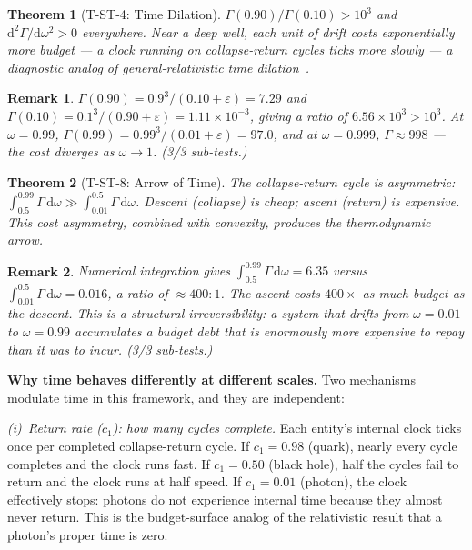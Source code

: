 \documentclass[
  aps,
  prd,
  twocolumn,
  superscriptaddress,
  nofootinbib,
  floatfix
]{revtex4-2}
\newtheorem{theorem}{Theorem}
\newtheorem{remark}{Remark}
\newcommand{\Gam}{\Gamma}
\newcommand{\eps}{\varepsilon}
\newcommand{\dd}{\mathrm{d}}
\begin{document}
\begin{theorem}[T-ST-4: Time Dilation]\label{thm:T4}
$\Gam(0.90)/\Gam(0.10) > 10^3$ and $\dd^2\Gam/\dd\omega^2 > 0$
everywhere.  Near a deep well, each unit of drift costs
exponentially more budget --- a clock running on collapse-return
cycles ticks more slowly --- a diagnostic analog of
general-relativistic time
dilation~\cite{einstein1916gr,misner1973gravitation}.
\end{theorem}

\begin{remark}
$\Gam(0.90) = 0.9^3/(0.10 + \eps) = 7.29$ and
$\Gam(0.10) = 0.1^3/(0.90 + \eps) = 1.11 \times 10^{-3}$,
giving a ratio of $6.56 \times 10^{3} > 10^{3}$.
At $\omega = 0.99$, $\Gam(0.99) = 0.99^3/(0.01 + \eps)
= 97.0$, and at $\omega = 0.999$, $\Gam \approx 998$ ---
the cost diverges as $\omega \to 1$.  (3/3 sub-tests.)
\end{remark}

\begin{theorem}[T-ST-8: Arrow of Time]\label{thm:T8}
The collapse-return cycle is asymmetric:
$\int_{0.5}^{0.99}\Gam\,\dd\omega \gg
\int_{0.01}^{0.5}\Gam\,\dd\omega$.
Descent (collapse) is cheap; ascent (return) is expensive.
This cost asymmetry, combined with convexity, produces the
thermodynamic arrow.
\end{theorem}

\begin{remark}
Numerical integration gives
$\int_{0.5}^{0.99}\Gam\,\dd\omega = 6.35$ versus
$\int_{0.01}^{0.5}\Gam\,\dd\omega = 0.016$,
a ratio of $\approx 400\!:\!1$.  The ascent costs
$400\times$ as much budget as the descent.  This is a
structural irreversibility: a system that drifts from
$\omega = 0.01$ to $\omega = 0.99$ accumulates a budget
debt that is enormously more expensive to repay than it
was to incur.  (3/3 sub-tests.)
\end{remark}

\textbf{Why time behaves differently at different scales.}
Two mechanisms modulate time in this framework, and they
are independent:

\emph{(i)~Return rate ($c_1$): how many cycles complete.}
Each entity's internal clock ticks once per completed
collapse-return cycle.  If $c_1 = 0.98$ (quark), nearly
every cycle completes and the clock runs fast.  If $c_1 =
0.50$ (black hole), half the cycles fail to return and
the clock runs at half speed.  If $c_1 = 0.01$ (photon),
the clock effectively stops: photons do not experience
internal time because they almost never return.  This is
the budget-surface analog of the relativistic result that
a photon's proper time is zero.
\end{document}
